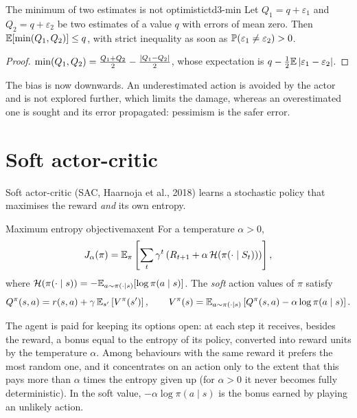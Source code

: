 \begin{proposition}{The minimum of two estimates is not optimistic}{td3-min}
  Let $Q_1 = q + \varepsilon_1$ and $Q_2 = q + \varepsilon_2$ be two
  estimates of a value $q$ with errors of mean zero. Then $\mathbb{E}[\min(Q_1,
  Q_2)] \leq q$, with strict inequality as soon as $\mathbb{P}(\varepsilon_1 \neq
  \varepsilon_2) > 0$.
\end{proposition}

\begin{proof}
  $\min(Q_1, Q_2) = \frac{Q_1 + Q_2}{2} - \frac{\left\lvert Q_1 - Q_2 \right\rvert}{2}$, whose
  expectation is $q - \frac{1}{2} \mathbb{E}\left\lvert \varepsilon_1 - \varepsilon_2 \right\rvert$.
\end{proof}

The bias is now downwards. An underestimated action is avoided by the
actor and is not explored further, which limits the damage, whereas an
overestimated one is sought and its error propagated: pessimism is the
safer error.

\section{Soft actor-critic}

Soft actor-critic (SAC, Haarnoja et al., 2018) learns a stochastic policy
that maximises the reward \emph{and} its own entropy.

\begin{definition}{Maximum entropy objective}{maxent}
  For a temperature $\alpha > 0$,
  \begin{equation}
    J_\alpha(\pi) = \mathbb{E}_\pi\left[ \sum_t \gamma^t \left( R_{t+1} + \alpha\,
    \mathcal{H}(\pi(\cdot \mid S_t)) \right) \right],
  \end{equation}
  where $\mathcal{H}(\pi(\cdot \mid s)) = -\mathbb{E}_{a \sim \pi(\cdot \mid s)}[\log
  \pi(a \mid s)]$. The \emph{soft} action values of $\pi$ satisfy
  \begin{equation}
    \label{eq:soft-bellman}
    Q^\pi(s, a) = r(s, a) + \gamma\, \mathbb{E}_{s'}\left[ V^\pi(s') \right],
    \qquad V^\pi(s) = \mathbb{E}_{a \sim \pi(\cdot \mid s)}\left[ Q^\pi(s, a) - \alpha
    \log \pi(a \mid s) \right].
  \end{equation}
\end{definition}

\begin{intuition}
  The agent is paid for keeping its options open: at each step it receives,
  besides the reward, a bonus equal to the entropy of its policy, converted
  into reward units by the temperature $\alpha$. Among behaviours with the
  same reward it prefers the most random one, and it concentrates on an
  action only to the extent that this pays more than $\alpha$ times the
  entropy given up (for $\alpha > 0$ it never becomes fully deterministic).
  In the soft value, $-\alpha \log \pi(a \mid s)$ is the bonus earned by
  playing an unlikely action.
\end{intuition}

